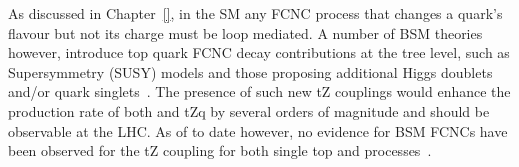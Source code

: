 As discussed in Chapter~\ref{}, in the SM any FCNC process that changes a quark's flavour but not its charge must be loop mediated.
A number of BSM theories however, introduce top quark FCNC decay contributions at the tree level, such as Supersymmetry (SUSY) models and those proposing additional Higgs doublets and/or quark singlets~\cite{AguilarSaavedra:2004wm}.
The presence of such new tZ couplings would enhance the production rate of both \ttZ and tZq by several orders of magnitude and should be observable at the LHC. 
As of to date however, no evidence for BSM FCNCs have been observed for the tZ coupling for both single top and \ttbar processes~\cite{Sirunyan:2with017kkr}.
